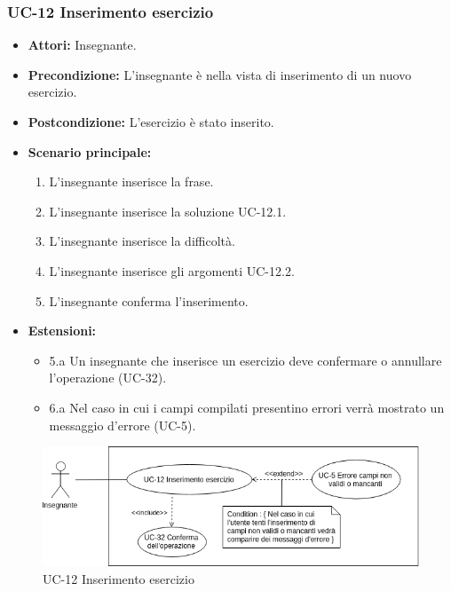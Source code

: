 \subsubsection{UC-12 Inserimento esercizio}
	\begin{itemize}
		\item \textbf{Attori: }Insegnante.
		\item \textbf{Precondizione: }L'insegnante è nella vista di inserimento di un nuovo esercizio.
		\item \textbf{Postcondizione: }L'esercizio è stato inserito.
		\item \textbf{Scenario principale: }
		\begin{enumerate} 
		\item L'insegnante inserisce la frase.
		\item L'insegnante inserisce la soluzione UC-12.1.
		\item L'insegnante inserisce la difficoltà.
		\item L'insegnante inserisce gli argomenti UC-12.2.
		\item L'insegnante conferma l'inserimento.
		\end{enumerate}
		\item \textbf{Estensioni:} 
		\begin{itemize}
			\item 5.a Un insegnante che inserisce un esercizio deve confermare o annullare l'operazione (UC-32).
		\item 6.a Nel caso in cui i campi compilati presentino errori verrà mostrato un messaggio d'errore (UC-5).
		\end{itemize}
	\end{itemize}
	\begin{figure}[h]
	\centering
	\includegraphics[scale=0.7]{images/UC-12.png}
	\caption{UC-12 Inserimento esercizio}
\end{figure}

